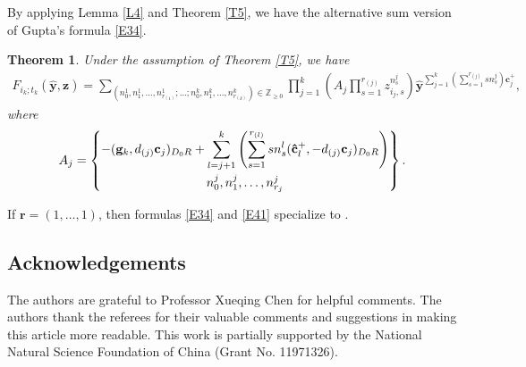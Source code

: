 \documentclass[10pt,a4paper]{amsart}
\numberwithin{equation}{section}
\newtheorem{Theorem}{Theorem}[section]
\begin{document}
By applying Lemma \ref{L4} and Theorem \ref{T5}, we have the alternative sum version of Gupta's formula \eqref{E34}.
\begin{Theorem}\label{T6}
 Under the assumption of Theorem {\rm\ref{T5}}, we have
 \begin{align}
 F_{i_k;t_k}(\hat{\mathbf{y}},\mathbf{z})=\sum_{(n_0^1,n_{1}^{1},\dots,n_{r_{(1)}}^1;\dots;n_0^{k},n_{1}^{k},\dots,n_{r_{(k)}}^k)\in\mathbb{Z}_{\ge0}}
 \prod\limits_{j=1}^{k}\left(A_j\prod\limits_{s=1}^{r_{(j)}}z_{i_j,s}^{n_s^j}\right)\hat{\mathbf{y}}^{\sum_{j=1}^{k}(\sum_{s=1}^{r_{(j)}}sn_s^j)\mathbf{c}_{j}^+},\label{E41}
 \end{align}
 where
 \begin{align*}
 A_j=\begin{Bmatrix}\displaystyle -(\mathbf{g}_{k},d_{(j)}\mathbf{c}_{j})_{D_0R}+\sum\limits_{l=j+1}^{k}
 \left(\sum\limits_{s=1}^{r_{(l)}}sn_{s}^{l}(\mathbf{\hat{c}}_{l}^+,-d_{(j)}\mathbf{c}_{j})_{D_0R}\right)\vspace{1mm}\\ n_0^j,n_{1}^j,\dots,n_{r_{j}}^j\end{Bmatrix}.
 \end{align*}
\end{Theorem}
\begin{Remark}
 If $\mathbf{r}=(1,\dots, 1)$, then formulas \eqref{E34} and \eqref{E41} specialize to \cite[Theorems 3.1 and~6.2]{LMN2023}.
\end{Remark}

\subsection*{Acknowledgements}

The authors are grateful to Professor Xueqing Chen for helpful comments. The authors thank the referees for their valuable comments and suggestions in making this article more readable. This work is partially supported by the National Natural Science Foundation of China (Grant No. 11971326).


\end{document}
